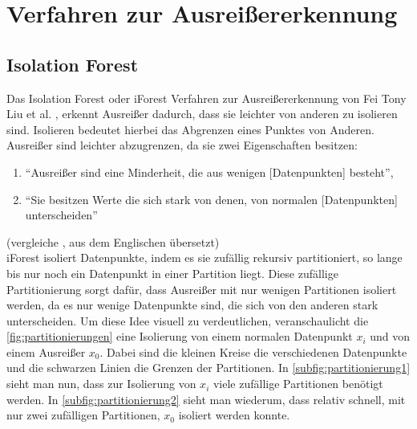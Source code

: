 \section{Verfahren zur Ausreißererkennung}


\subsection{Isolation Forest}
Das Isolation Forest oder iForest Verfahren zur Ausreißererkennung von Fei Tony Liu et al. \cite{iForest}, erkennt Ausreißer dadurch, dass sie leichter von anderen zu isolieren sind. Isolieren bedeutet hierbei das Abgrenzen eines Punktes von Anderen. Ausreißer sind leichter abzugrenzen, da sie zwei Eigenschaften besitzen:
\begin{enumerate}
    \item "`Ausreißer sind eine Minderheit, die aus wenigen [Datenpunkten] besteht"',
    \item "`Sie besitzen Werte die sich stark von denen, von normalen [Datenpunkten] unterscheiden"'
\end{enumerate}
(vergleiche \cite[Ch. 1]{iForest}, aus dem Englischen übersetzt) \\
iForest isoliert Datenpunkte, indem es sie zufällig rekursiv partitioniert, so lange bis nur noch ein Datenpunkt in einer Partition liegt. Diese zufällige Partitionierung sorgt dafür, dass Ausreißer mit nur wenigen Partitionen isoliert werden, da es nur wenige Datenpunkte sind, die sich von den anderen stark unterscheiden. Um diese Idee visuell zu verdeutlichen, veranschaulicht die \autoref{fig:partitionierungen} eine Isolierung von einem normalen Datenpunkt $x_i$ und von einem Ausreißer $x_0$. Dabei sind die kleinen Kreise die verschiedenen Datenpunkte und die schwarzen Linien die Grenzen der Partitionen. In \autoref{subfig:partitionierung1} sieht man nun, dass zur Isolierung von $x_i$ viele zufällige Partitionen benötigt werden. In \autoref{subfig:partitionierung2} sieht man wiederum, dass relativ schnell, mit nur zwei zufälligen Partitionen, $x_0$ isoliert werden konnte.
